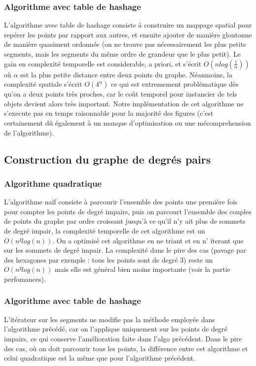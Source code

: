 \documentclass[a4paper,11pt]{article}
\begin{document}
\subsubsection{Algorithme avec table de hashage}

L'algorithme avec table de hashage consiste à construire un mappage spatial pour repérer les points par rapport
aux autres, et ensuite ajouter de manière gloutonne de manière quasiment ordonnée (on ne trouve pas nécessairement
les plus petits segments, mais les segments du même ordre de grandeur que le plus petit). Le gain en complexité temporelle
est considerable, a priori, et s'écrit $O(nlog(\frac{1}{\alpha}))$ où $\alpha$ est la plus petite distance entre deux points du graphe.
Néanmoins, la complexité spatiale s'écrit $O(4^{\alpha})$ ce qui est extremement problématique dès qu'on a deux points très proches,
car le coût temporel pour instancier de tels objets devient alors très important.
Notre implémentation de cet algorithme ne s'execute pas en temps raisonnable pour la majorité des figures (c'est certainement dû
également à un manque d'optimisation ou une mécomprehension de l'algorithme).
\subsection{Construction du graphe de degrés pairs}

\subsubsection{Algorithme quadratique}

L'algorithme naïf consiste à parcourir l'ensemble des points une première fois pour compter les points de degré impairs,
puis on parcourt l'ensemble des couples de points du graphe par ordre croissant jusqu'à ce qu'il n'y ait plus de sommets de
degré impair, la complexité temporelle de cet algorithme est un $O(n²log(n))$. On a optimisé cet algorithme en ne triant et en n'
iterant que sur les sommets de degré impair. La complexité dans le pire des cas (pavage par des hexagones par exemple : tous les points sont de degré 3) reste un $O(n²log(n))$ mais elle est général bien
moins importante (voir la partie perfomances).

\subsubsection{Algorithme avec table de hashage}

L'itérateur sur les segments ne modifie pas la méthode employée dans l'algorithme précédé, car on
l'applique uniquement sur les points de degré impairs, ce qui conserve l'amélioration faite dans
l'algo précédent. Dans le pire des cas, où on doit parcourir tous les points, la différence entre
cet algorithme et celui quadratique est la même que pour l'algorithme précédent.
\end{document}
